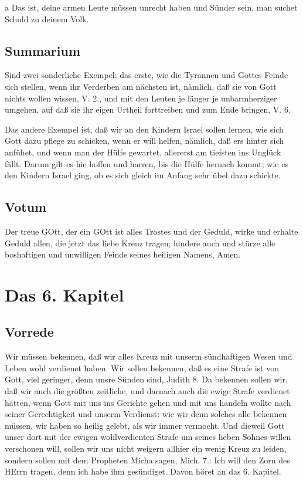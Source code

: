 a Das ist, deine armen Leute müssen unrecht haben und Sünder sein, man suchet Schuld zu deinem Volk.

\section{Summarium}

Sind zwei sonderliche Exempel: das erste, wie die Tyrannen und Gottes Feinde sich stellen, wenn ihr Verderben am nächsten ist, nämlich, daß sie von Gott nichts wollen wissen, V. 2., und mit den Leuten je länger je unbarmherziger umgehen, auf daß sie ihr eigen Urtheil forttreiben und zum Ende bringen, V. 6.

Das andere Exempel ist, daß wir an den Kindern Israel sollen lernen, wie sich Gott dazu pflege zu schicken, wenn er will helfen, nämlich, daß ers hinter sich anfühet, und wenn man der Hülfe gewartet, allererst am tiefsten ins Unglück fällt. Darum gilt es hie hoffen und harren, bis die Hülfe hernach kommt; wie es den Kindern Israel ging, ob es sich gleich im Anfang sehr übel dazu schickte.

\section{Votum}

Der treue GOtt, der ein GOtt ist alles Trostes und der Geduld, wirke und erhalte Geduld allen, die jetzt das liebe Kreuz tragen; hindere auch und stürze alle boshaftigen und unwilligen Feinde seines heiligen Namens, Amen.

\chapter{Das 6. Kapitel}

\section{Vorrede}

Wir müssen bekennen, daß wir alles Kreuz mit unserm sündhaftigen Wesen und Leben wohl verdienet haben. Wir sollen bekennen, daß es eine Strafe ist von Gott, viel geringer, denn unsre Sünden sind, Judith 8. Da bekennen sollen wir, daß wir auch die größten zeitliche, und darnach auch die ewige Strafe verdienet hätten, wenn Gott mit uns ins Gerichte gehen und mit uns handeln wollte nach seiner Gerechtigkeit und unserm Verdienst: wie wir denn solches alle bekennen müssen, wir haben so heilig gelebt, als wir immer vermocht. Und dieweil Gott unser dort mit der ewigen wohlverdienten Strafe um seines lieben Sohnes willen verschonen will, sollen wir uns nicht weigern allhier ein wenig Kreuz zu leiden, sondern sollen mit dem Propheten Micha sagen, Mich. 7.: Ich will den Zorn des HErrn tragen, denn ich habe ihm gesündiget. Davon höret an das 6. Kapitel.


